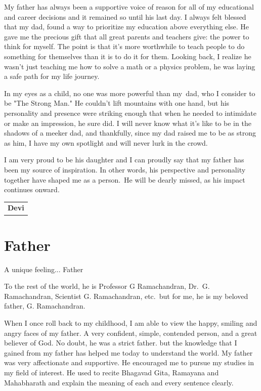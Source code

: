 My father has always been a supportive voice of reason for all of my educational and career decisions and it remained so until his last day. I always felt blessed that my dad, found a way to prioritize my education above everything else. He gave me the precious gift that all great parents and teachers give: the power to think for myself. The point is that it's more worthwhile to teach people to do something for themselves than it is to do it for them. Looking back, I realize he wasn't just teaching me how to solve a math or a physics problem, he was laying a safe path for my life journey.

In my eyes as a child, no one was more powerful than my dad, who I consider to be "The Strong Man." He couldn't lift mountains with one hand, but his personality and presence were striking enough that when he needed to intimidate or make an impression, he sure did. I will never know what it's like to be in the shadows of a meeker dad, and thankfully, since my dad raised me to be as strong as him, I have my own spotlight and will never lurk in the crowd. 

I am very proud to be his daughter and I can proudly say that my father has been my source of inspiration. In other words, his perspective and personality together have shaped me as a person. He will be dearly missed, as his impact continues onward.
\bigskip

\begin{flushright}
\begin{tabular}{c}
\textbf{Devi}
\end{tabular}
\end{flushright}
\newpage

\section*{Father}

A unique feeling... Father

To the rest of the world, he is Professor G Ramachandran, Dr.\ G. Ramachandran, Scientist  G. Ramachandran, etc.\ but for me, he is my beloved father, G. Ramachandran. 

When I once roll back to my childhood, I am able to view the happy, smiling and angry faces of my father. A very confident, simple, contended person, and a great believer of God. No doubt, he was a strict father. but the knowledge that I gained from my father has helped me today to understand the world. My father was very affectionate and supportive. He encouraged me to pursue my studies in my field of interest. He used to recite Bhagavad Gita, Ramayana and Mahabharath and explain the meaning of each and every sentence clearly. 


